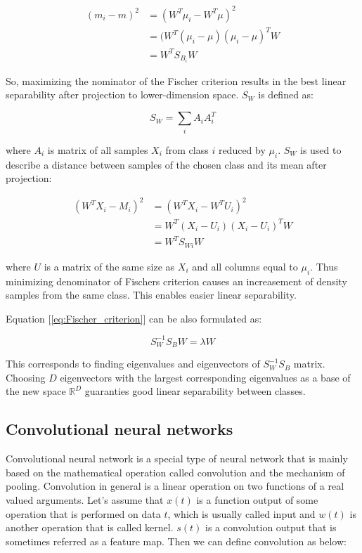 \documentclass[a4paper, 10 pt, journal]{ieeeconf}
\begin{document}
\begin{align}
    (m_i - m)^2 &= (W^T \mu_i - W^T \mu)^2 \nonumber \\
                &= (W^T (\mu_i - \mu)(\mu_i - \mu)^T W \\
                &= W^T S_{B_i} W \nonumber
\end{align}

So, maximizing the nominator of the Fischer criterion results in the best linear separability after projection to lower-dimension space.
$S_{W}$ is defined as:

\begin{equation}
    S_{W} = \sum_{i} A_{i}A_{i}^T
    \label{eq:SW}
\end{equation}

where $A_i$ is matrix of all samples $X_i$ from class $i$ reduced by $\mu_i$. $S_W$ is used to describe a distance between samples of the chosen class and its mean after projection:

\begin{align}
    (W^{T} X_i - M_i)^2 &= (W^{T} X_i - W^{T} U_i)^2 \nonumber \\
                        &= W^{T} (X_i - U_i)(X_i - U_i)^T W \\
                        &= W^{T} S_{Wi} W \nonumber
\end{align}

where $U$ is a matrix of the same size as $X_i$ and all columns equal to $\mu_i$. Thus minimizing denominator of Fischers criterion causes an increasement of density samples from the same class. This enables easier linear separability.

Equation [\ref{eq:Fischer_criterion}] can be also formulated as:

\begin{equation}
    S_{W}^{-1} S_{B} W = \lambda W
\end{equation}

This corresponds to finding eigenvalues and eigenvectors of $S_{W}^{-1} S_{B}$ matrix. Choosing $D$ eigenvectors with the largest corresponding eigenvalues as a base of the new space $\mathbb{R}^D$ guaranties good linear separability between classes. 

\subsection{Convolutional neural networks}

Convolutional neural network is a special type of neural network that is mainly based on the mathematical operation called convolution and the mechanism of pooling. Convolution in general is a linear operation on two functions of a real valued arguments. Let's assume that $x(t)$ is a function output of some operation that is performed on data $t$, which is usually called input and $w(t)$ is another operation that is called kernel. $s(t)$ is a convolution output that is sometimes referred as a feature map. Then we can define convolution as below:
\end{document}
